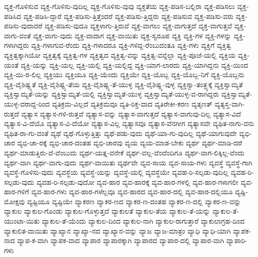 {ವ್ಯಕ್ತ-ಗೊಳಿಸುವ
ವ್ಯಕ್ತ-ಗೊಳಿಸು-ವುದಿಲ್ಲ
ವ್ಯಕ್ತ-ಗೊಳಿಸು-ವುವು
ವ್ಯಕ್ತತೆಯ
ವ್ಯಕ್ತ-ಪಡಿಸ-ಬಲ್ಲಿರಾ
ವ್ಯಕ್ತ-ಪಡಿಸಲು
ವ್ಯಕ್ತ-ಪಡಿಸಿದ
ವ್ಯಕ್ತ-ಪಡಿಸಿ-ದ್ದಾರೆ
ವ್ಯಕ್ತ-ಪಡಿಸು-ತ್ತಿತ್ತೆಂದರೆ
ವ್ಯಕ್ತ-ಪಡಿಸು-ತ್ತಿದ್ದರು
ವ್ಯಕ್ತ-ಪಡಿಸುವ
ವ್ಯಕ್ತ-ಪಡಿಸು-ವರು
ವ್ಯಕ್ತ-ಪಡಿಸು-ವುದಾದರೆ
ವ್ಯಕ್ತ-ಪಡಿಸು-ವುದೂ
ವ್ಯಕ್ತಳಾಗು-ತ್ತಿರುವೆ
ವ್ಯಕ್ತ-ವಾಗಲು
ವ್ಯಕ್ತ-ವಾಗುತ್ತದೆ
ವ್ಯಕ್ತ-ವಾಗುತ್ತವೆ
ವ್ಯಕ್ತ-ವಾಗು-ವಂತೆ
ವ್ಯಕ್ತ-ವಾಗು-ವುದು
ವ್ಯಕ್ತ-ವಾದಾಗ
ವ್ಯಕ್ತ-ವಾಯಿತು
ವ್ಯಕ್ತ-ಸ್ವರೂಪ
ವ್ಯಕ್ತಿ
ವ್ಯಕ್ತಿ-ಗಳ
ವ್ಯಕ್ತಿ-ಗಳನ್ನು
ವ್ಯಕ್ತಿ-ಗಳಾಗಿದ್ದರು
ವ್ಯಕ್ತಿ-ಗಳಾಗುವ-ರೆಂದು
ವ್ಯಕ್ತಿ-ಗಳಾದರೂ
ವ್ಯಕ್ತಿ-ಗಳಿದ್ದ-ರೆಂಬುದಂತೂ
ವ್ಯಕ್ತಿ-ಗಳು
ವ್ಯಕ್ತಿಗೆ
ವ್ಯಕ್ತಿತ್ವ
ವ್ಯಕ್ತಿತ್ವಕ್ಕಾಗಿಯೋ
ವ್ಯಕ್ತಿತ್ವಕ್ಕೆ
ವ್ಯಕ್ತಿತ್ವ-ಗಳ
ವ್ಯಕ್ತಿತ್ವದ
ವ್ಯಕ್ತಿತ್ವ-ವನ್ನು
ವ್ಯಕ್ತಿತ್ವ-ವನ್ನೆಲ್ಲಾ
ವ್ಯಕ್ತಿ-ಪೂಜೆ-ಯಲ್ಲಿ
ವ್ಯಕ್ತಿಯ
ವ್ಯಕ್ತಿ-ಯಂತೆ
ವ್ಯಕ್ತಿ-ಯನ್ನು
ವ್ಯಕ್ತಿ-ಯಲ್ಲ
ವ್ಯಕ್ತಿ-ಯಲ್ಲಿ
ವ್ಯಕ್ತಿ-ಯಲ್ಲಿದ್ದ
ವ್ಯಕ್ತಿ-ಯಾಗ-ಲಾರದು
ವ್ಯಕ್ತಿ-ಯಾಗಿದ್ದನು
ವ್ಯಕ್ತಿ-ಯಿಂದ
ವ್ಯಕ್ತಿ-ಯಿ-ರ-ಲಿಲ್ಲ
ವ್ಯಕ್ತಿಯು
ವ್ಯಕ್ತಿಯೂ
ವ್ಯಕ್ತಿ-ಯೆಂದು
ವ್ಯಕ್ತಿಯೇ
ವ್ಯಕ್ತಿ-ಯೊಬ್ಬ
ವ್ಯಕ್ತಿ-ಯೊಬ್ಬ-ನಿಗೆ
ವ್ಯಕ್ತಿ-ಯೊಬ್ಬನು
ವ್ಯಕ್ತಿ-ವೈಶಿಷ್ಟ್ಯತೆ
ವ್ಯಕ್ತಿ-ವೈಶಿಷ್ಟ್ಯ-ತೆಯ
ವ್ಯಕ್ತಿ-ವೈಶಿಷ್ಟ್ಯ-ತೆ-ಯುಳ್ಳ
ವ್ಯಕ್ತಿ-ವೈಶಿಷ್ಟ್ಯ-ವುಳ್ಳ
ವ್ಯಕ್ತಿಸ್ವಾ-ತಂತ್ರ್ಯಕ್ಕೆ
ವ್ಯಕ್ತಿಸ್ವಾಮ್ಯತೆ
ವ್ಯಕ್ತಿಸ್ವಾಮ್ಯತೆ-ಯನ್ನು
ವ್ಯಕ್ತಿಸ್ವಾಮ್ಯತೆ-ಯಲ್ಲಿ
ವ್ಯಕ್ತಿಸ್ವಾಮ್ಯತೆ-ಯುಳ್ಳ
ವ್ಯಕ್ತಿಸ್ವಾಮ್ಯತೆ-ಯುಳ್ಳ-ವ-ರಾಗಿದ್ದರು
ವ್ಯಕ್ತಿಸ್ವಾಮ್ಯತೆ-ಯುಳ್ಳ-ವರಾದ್ದ-ರಿಂದ
ವ್ಯತಿಕ್ರಮ-ವಿಲ್ಲದೆ
ವ್ಯತಿಕ್ರಮವೂ
ವ್ಯತಿ-ರಿಕ್ತ-ವಾದ
ವ್ಯತಿರೇಕೀ-ಕರಣ
ವ್ಯತೃಣತ್
ವ್ಯತ್ಯಸ್ತ-ವಾಗಿ-ರುತ್ತದೆ
ವ್ಯತ್ಯಾಸ
ವ್ಯತ್ಯಾಸ-ಗಳಿ-ರುತ್ತವೆ
ವ್ಯತ್ಯಾಸ-ವನ್ನು
ವ್ಯತ್ಯಾಸ-ವಾಗುತ್ತದೆ
ವ್ಯತ್ಯಾಸ-ವಾಗುವು-ದಿಲ್ಲ
ವ್ಯತ್ಯಾಸ-ವಿದೆ
ವ್ಯತ್ಯಾಸ-ವಿ-ದೆಯೊ
ವ್ಯತ್ಯಾಸ-ವಿ-ದೆಯೋ
ವ್ಯತ್ಯಾಸ-ವಿಲ್ಲ
ವ್ಯತ್ಯಾಸವೂ
ವ್ಯತ್ಯಾಸ-ವೆನಗೀಗ
ವ್ಯತ್ಯಾಸವೇ
ವ್ಯಥಿತ-ನಾಗು-ವನು
ವ್ಯಥಿತ-ರಾ-ಗು-ವಂತೆ
ವ್ಯಥೆ
ವ್ಯಥೆ-ಗೊಳ್ಳುತ್ತಿತ್ತು
ವ್ಯಥೆ-ಪಡು-ವುದು
ವ್ಯಥೆ-ಯಾ-ಗು-ವುದಿಲ್ಲ
ವ್ಯಥೆ-ಯಾಗುವುದೇ
ವ್ಯಭಿ-ಚಾರ
ವ್ಯಭಿ-ಚಾ-ರಕ್ಕೆ
ವ್ಯಭಿ-ಚಾರ-ದಂತಹ
ವ್ಯಭಿ-ಚಾರವು
ವ್ಯಯ
ವ್ಯಯ-ಮಾಡ-ಬೇಕು
ವ್ಯರ್ಥ
ವ್ಯರ್ಥ-ಮಾಡಿ-ದರೆ
ವ್ಯರ್ಥ-ಮಾಡುತ್ತಿರು-ವೆ-ವೆಂಬುದು
ವ್ಯರ್ಥ-ಯತ್ನ-ವನೇಕೆ
ವ್ಯರ್ಥ-ವಲ್ಲ-ವೆಂದೆಂದಿಗೂ
ವ್ಯರ್ಥ-ವಾಗ-ಲಿಕ್ಕಿಲ್ಲ-ವೆಂದು
ವ್ಯರ್ಥ-ವಾಗಿ
ವ್ಯರ್ಥ-ವಾಗು-ವುದು
ವ್ಯರ್ಥ-ವಾಯಿತು
ವ್ಯರ್ಥವೇ
ವ್ಯವ-ಸಾಯ
ವ್ಯವ-ಸಾಯ-ಗಳು
ವ್ಯವಸ್ಥೆ
ವ್ಯವಸ್ಥೆ-ಗಾಗಿ
ವ್ಯವಸ್ಥೆ-ಗೊಳಿಸು-ವುದು
ವ್ಯವಸ್ಥೆಯ
ವ್ಯವಸ್ಥೆ-ಯನ್ನು
ವ್ಯವಸ್ಥೆ-ಯಲ್ಲಿ
ವ್ಯವಸ್ಥೆಯೇ
ವ್ಯವಹ-ರಿ-ಸಲ್ಪಡು-ವುದಿಲ್ಲ
ವ್ಯವಹ-ರಿ-ಸಲ್ಪಡು-ವುದು
ವ್ಯವಹ-ರಿ-ಸಲ್ಪಡು-ವುದೋ
ವ್ಯವ-ಹಾರ
ವ್ಯವ-ಹಾರಕ್ಕೆ
ವ್ಯವ-ಹಾರ-ಗಳಲ್ಲಿ
ವ್ಯವ-ಹಾರ-ಗಳಾಗಲೀ
ವ್ಯವ-ಹಾರ-ಗಳಿಗೆ
ವ್ಯವ-ಹಾರ-ಗಳು
ವ್ಯವ-ಹಾರ-ಗಳೆಲ್ಲವೂ
ವ್ಯವ-ಹಾರದ
ವ್ಯವ-ಹಾರ-ದಲ್ಲಿ
ವ್ಯವ-ಹಾರ-ದಲ್ಲಿಯೂ
ವ್ಯಷ್ಟಿ-ಮೋಕ್ಷವು
ವ್ಯಷ್ಟಿಯೂ
ವ್ಯಷ್ಟಿಯೇ
ವ್ಯಾಕರಣ
ವ್ಯಾಕರ-ಣದ
ವ್ಯಾಕರ-ಣ-ದಂತಹ
ವ್ಯಾಕರ-ಣ-ದಲ್ಲಿ
ವ್ಯಾಕರ-ಣ-ವನ್ನು
ವ್ಯಾಕುಲ
ವ್ಯಾಕುಲ-ಗೊಂಡು
ವ್ಯಾಕುಲ-ಗೊಳ್ಳುತ್ತದೆ
ವ್ಯಾಕುಲತೆ
ವ್ಯಾಕುಲ-ತೆಯ
ವ್ಯಾಕುಲ-ತೆ-ಯನ್ನು
ವ್ಯಾಕುಲ-ತೆ-ಯುಂಟಾ-ಯಿತು
ವ್ಯಾಕುಲ-ತೆ-ಯೆಂದು
ವ್ಯಾಕುಲ-ದಿಂದ
ವ್ಯಾಕುಲ-ನಾಗಿ
ವ್ಯಾಕುಲ-ರಾಗುತ್ತಾರೆ
ವ್ಯಾಕುಲಾಗ್ರಹ-ದಿಂದ
ವ್ಯಾಕುಲಿತ-ವಾಯಿತು
ವ್ಯಾಖ್ಯಾನ
ವ್ಯಾಖ್ಯಾ-ನದ
ವ್ಯಾಖ್ಯಾನ-ವನ್ನು
ವ್ಯಾಜ
ವ್ಯಾಜ-ಮಾತ್ರಂ
ವ್ಯಾಧಿ
ವ್ಯಾಧಿ-ಯಾಗಿ
ವ್ಯಾಪಕ-ನಾದ
ವ್ಯಾಪ-ಕ-ವಾಗಿ
ವ್ಯಾಪಕ-ವಾದ
ವ್ಯಾಪಾರ
ವ್ಯಾಪಾರಕ್ಕಾಗಿ
ವ್ಯಾಪಾರದ
ವ್ಯಾಪಾರ-ದಲ್ಲಿ
ವ್ಯಾಪಾರ-ವಾಗಿ
ವ್ಯಾಪಾರಿ-ಗಳು
}
